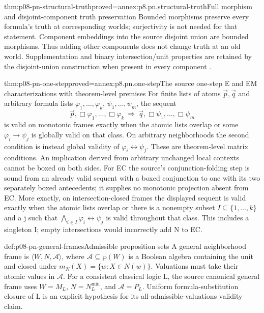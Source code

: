 \begin{hbtheorem}{thm:p08-pn-structural-truth}{proved=annex:p8.pn.structural-truth}{Full morphism and disjoint-component truth preservation}
Bounded morphisms preserve every formula's truth at corresponding
worlds; surjectivity is not needed for that statement. Component
embeddings into the source disjoint union are bounded morphisms.
Thus adding other components does not change truth at an old
world. Supplementation and binary intersection/unit properties
are retained by the disjoint-union construction when present
in every component \cite[props.~2.3--2.5]{Pacuit2017}.
\end{hbtheorem}

\begin{hbtheorem}{thm:p08-pn-one-step}{proved=annex:p8.pn.one-step}{The source one-step E and EM characterizations with theorem-level premises}
For finite lists of atoms \(\vec p,\vec q\) and arbitrary
formula lists \(\varphi_1,\ldots,\varphi_k\),
\(\psi_1,\ldots,\psi_m\), the sequent
\[
 \vec p,\Box\varphi_1,\ldots,\Box\varphi_k
 \ \Rightarrow\ \vec q,\Box\psi_1,\ldots,\Box\psi_m
\]
is valid on monotonic frames exactly when the atomic lists
overlap or some \(\varphi_i\to\psi_j\) is globally valid
on that class. On arbitrary neighborhoods the second condition
is instead global validity of \(\varphi_i\leftrightarrow\psi_j\).
These are theorem-level matrix conditions. An implication
derived from arbitrary unchanged local contexts cannot be
boxed on both sides. For EC the source's conjunction-folding
step is sound from an already valid sequent with a boxed
conjunction to one with its two separately boxed antecedents;
it supplies no monotonic projection absent from EC. More exactly,
on intersection-closed frames the displayed sequent is valid
exactly when the atomic lists overlap or there is a nonempty
subset \(I\subseteq\{1,\ldots,k\}\) and a j such that
\(\bigwedge_{i\in I}\varphi_i\leftrightarrow\psi_j\)
is valid throughout that class. This includes a singleton I;
empty intersections would incorrectly add N to EC.
\end{hbtheorem}

\begin{hbdefinition}{def:p08-pn-general-frames}{Admissible proposition sets}
A general neighborhood frame is \(\langle W,N,\mathcal A\rangle\),
where \(\mathcal A\subseteq\wp(W)\) is a Boolean algebra
containing the unit and closed under
\(m_N(X)=\{w:X\in N(w)\}\). Valuations must take their
atomic values in \(\mathcal A\). For a consistent classical
logic L, the source canonical general frame uses
\(W=M_L\), \(N=N_L^{\min}\), and \(\mathcal A=P_L\).
Uniform formula-substitution closure of L is an explicit
hypothesis for its all-admissible-valuations validity claim.
\end{hbdefinition}


